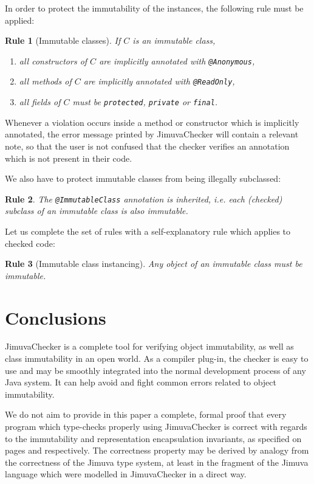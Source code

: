 \documentclass{pracamgr}
\theoremstyle{break}
\theoremstyle{break}
\theoremstyle{break}
\newtheorem{verrule}{Rule}
\begin{document}
In order to protect the immutability of the instances, the following
rule must be applied:
\begin{verrule}[Immutable classes]
  If $C$ is an immutable class, 
  \begin{enumerate}[label=(\arabic*)]
  \item all constructors of $C$ are implicitly annotated with \texttt{@Anonymous},
  \item all methods of $C$ are implicitly annotated with \texttt{@ReadOnly},  
  \item all fields of $C$ must be \texttt{protected}, \texttt{private} or \texttt{final}.
  \end{enumerate}
\end{verrule}

Whenever a violation occurs inside a method or constructor which is
implicitly annotated, the error message printed by JimuvaChecker will
contain a relevant note, so that the user is not confused that the
checker verifies an annotation which is not present in their code.

We also have to protect immutable classes from being illegally
subclassed: 
\begin{verrule}
  The \texttt{@ImmutableClass} annotation is inherited, i.e. each
  (checked) subclass of an immutable class is also immutable. 
\end{verrule}

Let us complete the set of rules with a self-explanatory rule which
applies to checked code:
\begin{verrule}[Immutable class instancing]
  Any object of an immutable class must be immutable. 
\end{verrule}

\section{Conclusions}

JimuvaChecker is a complete tool for verifying object immutability, as
well as class immutability in an open world. As a compiler plug-in,
the checker is easy to use and may be smoothly integrated into the
normal development process of any Java system. It can help avoid and
fight common errors related to object immutability. 

We do not aim to provide in this paper a complete, formal proof that
every program which type-checks properly using JimuvaChecker is
correct with regards to the immutability and representation
encapsulation invariants, as specified on pages \pageref{inv:open} and
\pageref{inv:encap} respectively. The correctness property may be
derived by analogy from the correctness of the Jimuva type system, at
least in the fragment of the Jimuva language which were modelled in
JimuvaChecker in a direct way. 
\end{document}
